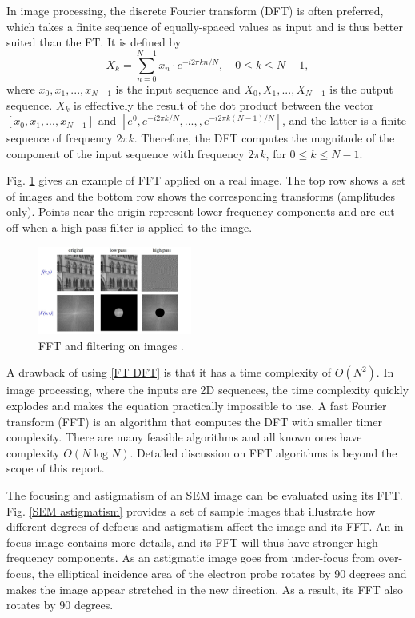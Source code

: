 \documentclass[12pt, conference]{IEEEtran}
\begin{document}
In image processing, the discrete Fourier transform (DFT) is often preferred, which takes a finite sequence of equally-spaced values as input and is thus better suited than the FT. It is defined by
\begin{equation}
    X_k = \sum_{n=0}^{N-1} x_n \cdot e^{-i2\pi kn/N}, \quad 0 \leq k \leq N-1,
    \label{FT DFT}
\end{equation}
where $x_0,x_1,...,x_{N-1}$ is the input sequence and $X_0,X_1,...,X_{N-1}$ is the output sequence. $X_k$ is effectively the result of the dot product between the vector $[x_0,x_1,...,x_{N-1}]$ and $[e^0,e^{-i2\pi k/N},...,,e^{-i2\pi k(N-1)/N}]$, and the latter is a finite sequence of frequency $2\pi k$. Therefore, the DFT computes the magnitude of the component of the input sequence with frequency $2\pi k$, for $0 \leq k \leq N-1$.

Fig. \ref{FT FFT on images} gives an example of FFT applied on a real image. The top row shows a set of images and the bottom row shows the corresponding transforms (amplitudes only). Points near the origin represent lower-frequency components and are cut off when a high-pass filter is applied to the image.

\begin{figure}[htbp]
    \centering
    \includegraphics[width=0.45\textwidth]{Images/FFT on images.jpg}
    \caption{FFT and filtering on images \cite{FT lecture}.}
    \label{FT FFT on images}
\end{figure}

A drawback of using \eqref{FT DFT} is that it has a time complexity of $O(N^2)$. In image processing, where the inputs are 2D sequences, the time complexity quickly explodes and makes the equation practically impossible to use. A fast Fourier transform (FFT) is an algorithm that computes the DFT with smaller timer complexity. There are many feasible algorithms and all known ones have complexity $O(N\log N)$. Detailed discussion on FFT algorithms is beyond the scope of this report.

The focusing and astigmatism of an SEM image can be evaluated using its FFT. Fig. \ref{SEM astigmatism} provides a set of sample images that illustrate how different degrees of defocus and astigmatism affect the image and its FFT. An in-focus image contains more details, and its FFT will thus have stronger high-frequency components. As an astigmatic image goes from under-focus from over-focus, the elliptical incidence area of the electron probe rotates by 90 degrees and makes the image appear stretched in the new direction. As a result, its FFT also rotates by 90 degrees.
\end{document}
